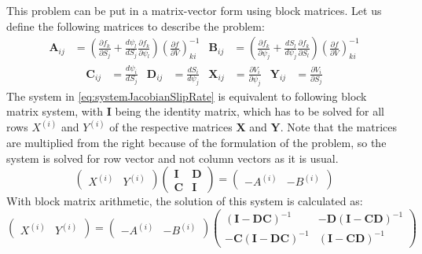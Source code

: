\documentclass{report}
\begin{document}
This problem can be put in a matrix-vector form using block matrices. Let us define the following matrices to describe the problem:
\begin{align}
	\mathbf{A}_{ij} &= \left(\frac{\partial f_k}{\partial S_j} + \frac{d \psi_l}{d S_j}\frac{\partial f_k}{\partial \psi_l} \right)\left(\frac{\partial f}{\partial V}\right)_{ki}^{-1} &
	\mathbf{B}_{ij} &= \left(\frac{\partial f_k}{\partial \psi_j}  + \frac{d S_l}{d \psi_j}\frac{\partial f_k}{\partial S_l}\right)\left(\frac{\partial f}{\partial V}\right)_{ki}^{-1}
\end{align}
\begin{align}
	\mathbf{C}_{ij} &= \frac{d\psi_i}{dS_j} &
	\mathbf{D}_{ij} &= \frac{dS_i}{d\psi_j} &
	\mathbf{X}_{ij} &= \frac{\partial V_i}{\partial \psi_j} &
	\mathbf{Y}_{ij} &= \frac{\partial V_i}{\partial S_j} 
\end{align}
The system in \autoref{eq:systemJacobianSlipRate} is equivalent to following block matrix system, with $\mathbf{I}$ being the identity matrix, which has to be solved for all rows $X^{(i)}$ and $Y^{(i)}$ of the respective matrices $\mathbf{X}$ and $\mathbf{Y}$. Note that the matrices are multiplied from the right because of the formulation of the problem, so the system is solved for row vector and not column vectors as it is usual.
\begin{equation}
	\begin{pmatrix}
		X^{(i)} & Y^{(i)}
	\end{pmatrix} \begin{pmatrix}
					  \mathbf{I} & \mathbf{D} \\
					  \mathbf{C} & \mathbf{I} 
				  \end{pmatrix}  = \begin{pmatrix}
									  -A^{(i)} & -B^{(i)}
								   \end{pmatrix}
\end{equation}
With block matrix arithmetic, the solution of this system is calculated as: 
\begin{equation}
	\begin{pmatrix}
		X^{(i)} & Y^{(i)}
	\end{pmatrix} = \begin{pmatrix}
						-A^{(i)} & -B^{(i)}
					\end{pmatrix} \begin{pmatrix}
									  (\mathbf{I} - \mathbf{D}\mathbf{C})^{-1} & 
									 -\mathbf{D}(\mathbf{I} - \mathbf{C}\mathbf{D})^{-1} \\
									 -\mathbf{C}(\mathbf{I} - \mathbf{D}\mathbf{C})^{-1} & 
									  (\mathbf{I} - \mathbf{C}\mathbf{D})^{-1} 
								  \end{pmatrix}
\end{equation}
\end{document}
